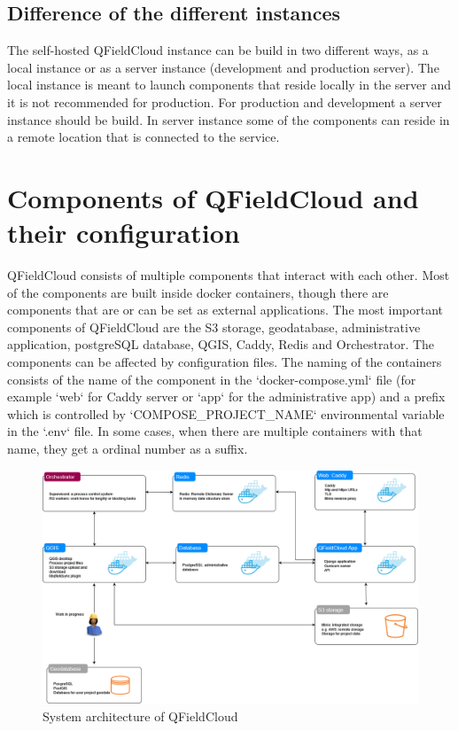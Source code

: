 \documentclass{article}
\begin{document}
\subsection{Difference of the different instances}
The self-hosted QFieldCloud instance can be build in two different ways, as a local instance or as a server instance (development and production server). The local instance is meant to launch components that reside locally in the server and it is not recommended for production. For production and development a server instance should be build. In server instance some of the components can reside in a remote location that is connected to the service.


\section{Components of QFieldCloud and their configuration}
\label{sec:Components}
\begin{markdown}
QFieldCloud consists of multiple components that interact with each other. Most of the components are built inside docker containers, though there are components that are or can be set as external applications. The most important components of QFieldCloud are the S3 storage, geodatabase, administrative application, postgreSQL database, QGIS, Caddy, Redis and Orchestrator. The components can be affected by configuration files. The naming of the containers consists of the name of the component in the `docker-compose.yml` file (for example `web` for Caddy server or `app` for the administrative app) and a prefix which is controlled by `COMPOSE_PROJECT_NAME` environmental variable in the `.env` file. In some cases, when there are multiple containers with that name, they get a ordinal number as a suffix.
\end{markdown}

\begin{figure}[H]
    \centering
    \includegraphics[width=1\textwidth]{qfielcloud_system_architecture.png}
    \caption{System architecture of QFieldCloud}
    \label{fig:system-architecture_graph}
\end{figure}
\end{document}
